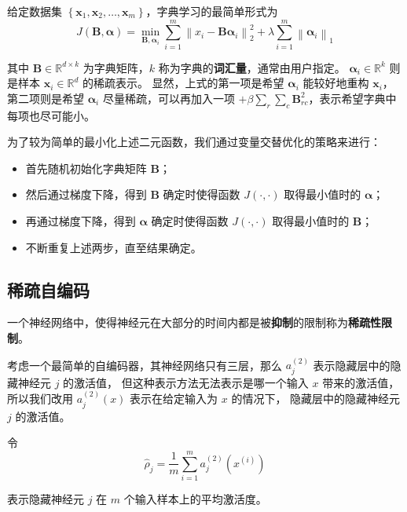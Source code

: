 给定数据集 $\left\{\boldsymbol{x}_1, \boldsymbol{x}_2, \dots, \boldsymbol{x}_m\right\}$，字典学习的最简单形式为
\begin{equation}
    J(\mathbf B, \boldsymbol{\alpha}) = \min_{\mathbf B, \boldsymbol{\alpha}_i} \sum_{i=1}^m
    \left\|x_i - \mathbf B \boldsymbol{\alpha}_i\right\|_2^2 
    + \lambda\sum_{i=1}^m\left\|\boldsymbol{\alpha}_i\right\|_1  
\end{equation}

其中 $\mathbf B \in \mathbb{R}^{d \times k}$ 为字典矩阵，$k$ 称为字典的\textbf{词汇量}，通常由用户指定。
$\boldsymbol{\alpha}_i \in \mathbb{R}^k$ 则是样本 $\boldsymbol{x}_i \in \mathbb{R}^d$ 的稀疏表示。
显然，上式的第一项是希望 $\boldsymbol{\alpha}_i$ 能较好地重构 $\boldsymbol{x}_i$，
第二项则是希望 $\boldsymbol{\alpha}_i$ 尽量稀疏，可以再加入一项 $+ \beta\sum_r\sum_c \mathbf B_{rc}^2$，表示希望字典中每项也尽可能小。

为了较为简单的最小化上述二元函数，我们通过变量交替优化的策略来进行：
\begin{itemize}
    \item 首先随机初始化字典矩阵 $\mathbf B$；
    \item 然后通过梯度下降，得到 $\mathbf B$ 确定时使得函数 $J(\cdot, \cdot)$ 取得最小值时的 $\boldsymbol{\alpha}$；
    \item 再通过梯度下降，得到 $\boldsymbol{\alpha}$ 确定时使得函数 $J(\cdot, \cdot)$ 取得最小值时的 $\mathbf B$；
    \item 不断重复上述两步，直至结果确定。
\end{itemize}

\subsection{稀疏自编码}

一个神经网络中，使得神经元在大部分的时间内都是被\textbf{抑制}的限制称为\textbf{稀疏性限制}。

考虑一个最简单的自编码器，其神经网络只有三层，那么 $a_j^{(2)}$ 表示隐藏层中的隐藏神经元 $j$ 的激活值，
但这种表示方法无法表示是哪一个输入 $x$ 带来的激活值，所以我们改用 $a_j^{(2)}(x)$ 表示在给定输入为 $x$ 的情况下，
隐藏层中的隐藏神经元 $j$ 的激活值。

令
\begin{equation}
    \hat{\rho}_j = \dfrac 1m \sum_{i=1}^m{a_j^{(2)}(x^{(i)})}
\end{equation}

表示隐藏神经元 $j$ 在 $m$ 个输入样本上的平均激活度。

